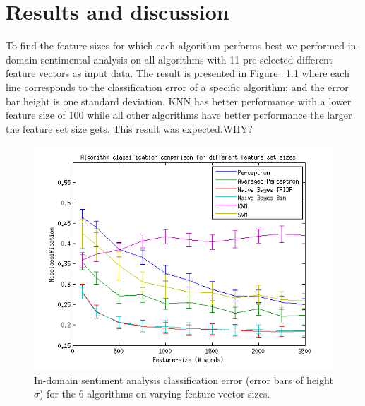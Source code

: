 \chapter{Results and discussion}
To find the feature sizes for which each algorithm performs best we performed in-domain sentimental analysis on all algorithms with 11 pre-selected different feature vectors as input data. The result is presented in Figure ~\ref{fig:featuresize} where each line corresponds to the classification error of a specific algorithm; and the error bar height is one standard deviation. KNN has better performance with a lower feature size of 100 while all other algorithms have better performance the larger the feature set size gets. This result was expected.WHY?
\begin{figure}[h!]
\centering
\includegraphics[width=1\linewidth]{../Plottar/feature-size100-2500all.png}
\caption{In-domain sentiment analysis classification error (error bars of height $\sigma$) for the 6 algorithms on varying feature vector sizes.}
\label{fig:featuresize}
\end{figure}

